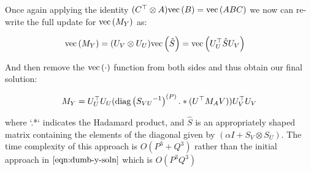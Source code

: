 Once again applying the identity $(C^\top \otimes A)\text{vec}\left(B\right) = \text{vec}\left(ABC\right)$ we now can re-write the full update for $\text{vec}\left(M_Y\right)$ as:

\begin{align}
\text{vec}\left(M_Y\right) & = (U_V \otimes U_U)\text{vec}\left(\hat S\right) = \text{vec}\left(U_U^\top \hat S U_V\right)
\end{align}

And then remove the $\text{vec}\left(\cdot\right)$ function from both sides and thus obtain our final solution:

\begin{align}
M_Y = U_U^\top U_U (\text{diag} \left( {{S_{VU}}^{-1}} \right)^{(P)} .* (U^\top M_A V)) U_V^\top U_V
\end{align}

where `.*` indicates the Hadamard product, and $\hat S$ is an appropriately shaped matrix containing the elements of the diagonal given by $(\alpha I + S_V \otimes S_U)$. The time complexity of this approach is $O(P^3 + Q^3)$ rather than the initial approach in $\eqref{eqn:dumb-y-soln}$ which is $O(P^3Q^3)$




